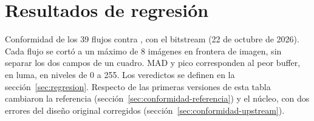 \chapter{Resultados de regresión}
\label{anx:regresion}

Conformidad de los 39 flujos contra , con el bitstream
 (22 de octubre de 2026). Cada flujo se cortó a un máximo de 8
imágenes en frontera de imagen, sin separar los dos campos de un cuadro. MAD
y pico corresponden al peor buffer, en luma, en niveles de 0 a 255. Los
veredictos se definen en la sección~\ref{sec:regresion}. Respecto de las
primeras versiones de esta tabla cambiaron la referencia
(sección~\ref{sec:conformidad-referencia}) y el núcleo, con dos errores del
diseño original corregidos (sección~\ref{sec:conformidad-upstream}).

